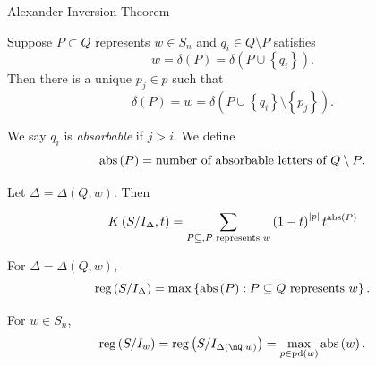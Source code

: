 \documentclass[co439]{subfiles}
\begin{document}
    \rruleline

    \begin{theorem}{Alexander Inversion Theorem}
    \end{theorem}
    
    \begin{lemma}{}
        Suppose $P\subset Q$ represents $w\in S_n$ and $q_i\in Q\setminus P$ satisfies
        \begin{equation*}
            w = \delta\left( P \right) = \delta\left( P\cup\left\lbrace q_i \right\rbrace \right).
        \end{equation*}
        Then there is a unique $p_j\in p$ such that
        \begin{equation*}
            \delta\left( P \right) = w = \delta\left( P\cup\left\lbrace q_i \right\rbrace\setminus \left\lbrace p_j \right\rbrace \right).
        \end{equation*}
    \end{lemma}

    \rruleline

    \np
    We say $q_i$ is \emph{absorbable} if $j>i$. We define
    \begin{equation*}
        \operatorname{abs}\left( P \right) = \text{number of absorbable letters of $Q\setminus P$}.
    \end{equation*}

    \begin{theorem}{}
        Let $\Delta = \Delta\left( Q,w \right)$. Then
        \begin{equation*}
            K\left( S /I_{\Delta}, t \right) = \sum^{}_{P\subseteq , P\text{ represents }w} \left( 1-t \right)^{\left| p \right|}t^{\operatorname{abs}\left( P \right)}
        \end{equation*}
    \end{theorem}
    
    \rruleline

    \clearpage

    \begin{cor}{}
        For $\Delta = \Delta\left( Q,w \right)$,
        \begin{equation*}
            \operatorname{reg}\left( S /I_{\Delta} \right) = \max\left\lbrace \operatorname{abs}\left( P \right):P\subseteq Q\text{ represents }w \right\rbrace.
        \end{equation*}
    \end{cor}	

    \rruleline

    \begin{cor}{}
        For $w\in S_n$,
        \begin{equation*}
            \reg\left( S /I_w \right) = \reg\left( S /I_{\Delta\left( \mQ,w \right)} \right) = \max_{p\in\pd\left( w \right)} \abs\left( w \right).
        \end{equation*}
    \end{cor}	
    
\end{document}
